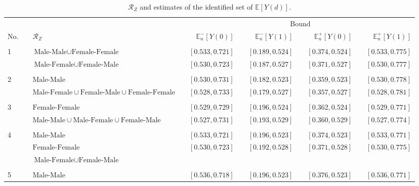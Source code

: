 \documentclass[12pt,a4paper,twoside]{article}
\renewcommand{\baselinestretch}{1.5}
\numberwithin{equation}{section}
\begin{document}
\clearpage
\renewcommand{\baselinestretch}{1}
\begin{sidewaystable}[p]
\centering
\caption{$\mathcal{R}_Z$ and estimates of the identified set of $\mathbb{E}[Y(d)]$.}
\begin{tabular}{lclcrcrcrcr}
\toprule
&	& &	& \multicolumn{7}{c}{Bound} \\
\cmidrule(r){4-11}	
No. & &	$\mathcal{R}_Z$	&	&	$\mathbb{E}_n^-[Y(0)]$	&	&	$\mathbb{E}_n^-[Y(1)]$	&	&	$\mathbb{E}_n^+[Y(0)]$	&	&	$\mathbb{E}_n^+[Y(1)]$\\
\midrule
& &\phantom{$\text{Male-Female}\cup\text{Female-Male}\cup\text{Female-Female}$}\\
1& & $\text{Male-Male}\cup\text{Female-Female}$	&	&	$[0.533,0.721]$	&	&	$[0.189,0.524]$	&	&	$[0.374,0.524]$	&	&	$[0.533,0.775]$
\\
& &$\text{Male-Female}\cup\text{Female-Male}$	&	&	\color{blue}$[0.530,0.723]$	&	&	\color{blue}$[0.187,0.527]$	&	&	\color{blue}$[0.371,0.527]$	&	&	\color{blue}$[0.530,0.777]$\\
\\
2 & &$\text{Male-Male}$	&	&	$[0.530,0.731]$	&	&	$[0.182,0.523]$	&	&	$[0.359,0.523]$	&	&	$[0.530,0.778]$
\\
& &$\text{Male-Female}\cup\text{Female-Male}\cup\text{Female-Female}$	&	&	\color{blue}$[0.528,0.733]$	&	&	\color{blue}$[0.179,0.527]$	&	&	\color{blue}$[0.357,0.527]$	&	&	\color{blue}$[0.528,0.781]$\\
\\
3 & &$\text{Female-Female}$	&	&	$[0.529,0.729]$	&	&	$[0.196,0.524]$	&	&	$[0.362,0.524]$	&	&	$[0.529,0.771]$
\\
& &$\text{Male-Male}\cup\text{Male-Female}\cup\text{Female-Male}$	& &\color{blue}$[0.527,0.731]$	&	&	\color{blue}$[0.193,0.529]$	&	&	\color{blue}$[0.360,0.529]$	&	&	\color{blue}$[0.527,0.774]$\\	
\\
4 & &$\text{Male-Male}$&	&	$[0.533,0.721]$	&	&	$[0.196,0.523]$	&	&	$[0.374,0.523]$	&	&	$[0.533,0.771]$
\\
& &$\text{Female-Female}$ & &\color{blue}$[0.530,0.723]$	&	&	\color{blue}$[0.192,0.528]$	&	&	\color{blue}$[0.371,0.528]$	&	&	\color{blue}$[0.530,0.775]$\\
& &$\text{Male-Female}\cup\text{Female-Male}$\\	
\\
5 & &$\text{Male-Male}$&	&	$[0.536,0.718]$	&	&	$[0.196,0.523]$	&	&	$[0.376,0.523]$	&	&	$[0.536,0.771]$

\end{tabular}
\end{sidewaystable}
\end{document}
